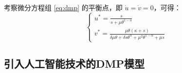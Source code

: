 \documentclass{article}
\begin{document}
考察微分方程组 \eqref{eq:dmp} 的平衡点，即 $\dot{u} = \dot{v} = 0$，可得：
\begin{equation}
    \begin{cases}
        u^* = \frac{s}{s + \mu \theta^{1-\alpha}} \\
        v^* = \frac{\mu \theta \left(\kappa + s\right)}{\delta \mu \theta + \delta s \theta^{\alpha} + \mu^{2} \theta^{1 - \alpha} + \mu s}
    \end{cases}
\end{equation}

\subsection{引入人工智能技术的DMP模型}



\printbibliography[title={参考文献}]
\end{document}
